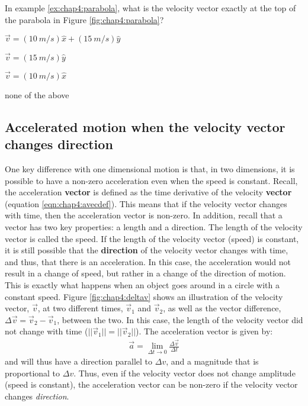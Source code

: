 \begin{checkpointMC}{In example \ref{ex:chap4:parabola}, what is the velocity vector exactly at the top of the parabola in Figure \ref{fig:chap4:parabola}?}
\item $\vec v=(\SI{10}{m/s})\hat x+(\SI{15}{m/s})\hat y$
\item $\vec v=(\SI{15}{m/s})\hat y$
\item $\vec v=(\SI{10}{m/s})\hat x$ %
\item none of the above
\end{checkpointMC}

\subsection{Accelerated motion when the velocity vector changes direction}
\label{sec:chap4:accvconst}
One key difference with one dimensional motion is that, in two dimensions, it is possible to have a non-zero acceleration even when the speed is constant. Recall, the acceleration \textbf{vector} is defined as the time derivative of the velocity \textbf{vector} (equation \ref{eqn:chap4:avecdef}). This means that if the velocity vector changes with time, then the acceleration vector is non-zero. In addition, recall that a vector has two key properties: a length and a direction. The length of the velocity vector is called the speed. If the length of the velocity vector (speed) is constant, it is still possible that the \textbf{direction} of the velocity vector changes with time, and thus, that there is an acceleration. In this case, the acceleration would not result in a change of speed, but rather in a change of the direction of motion. This is exactly what happens when an object goes around in a circle with a constant speed. 
Figure \ref{fig:chap4:deltav} shows an illustration of the velocity vector, $\vec v$, at two different times, $\vec v_1$ and $\vec v_2$, as well as the vector difference, $\Delta \vec v=\vec v_2 - \vec v_1$, between the two. In this case, the length of the velocity vector did not change with time ($||\vec v_1||=||\vec v_2||$). The acceleration vector is given by:
\begin{align*}
\vec a = \lim_{\Delta t\to 0}\frac{\Delta \vec v}{\Delta t}
\end{align*}
and will thus have a direction parallel to $\Delta v$, and a magnitude that is proportional to $\Delta v$. Thus, even if the velocity vector does not change amplitude (speed is constant), the acceleration vector can be non-zero if the velocity vector changes \textit{direction}.

